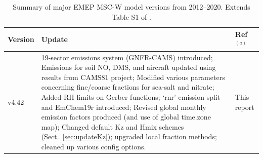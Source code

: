 \begin{table}
\begin{footnotesize}
\caption{Summary of major EMEP MSC-W model versions from 2012--2020.
Extends Table S1 of \citealt{Simpson:EMEP2012}.
}
\label{tab:Updates}
\centering
\begin{tabular}{lp{11cm}l}
\hline
Version & Update                                        & Ref$^{(a)}$   \\
\hline
v4.42  &  19-sector emissions system (GNFR-CAMS) introduced; %
Emissions for soil NO, DMS, and aircraft updated using results from
 CAMS81 project; %
 Modified various parameters concerning fine/coarse fractions for sea-salt and nitrate; Added RH limits on Gerber functions;
 `rnr' emission split and EmChem19r introduced;
           Revised global monthly emission factors produced (and use of global time.zone map);  %
           Changed default Kz  and Hmix schemes (Sect.~\ref{sec:updateKz}); 
         upgraded local fraction methods; cleaned up various config options. 
        & This report \\

\end{tabular}
\end{footnotesize}
\end{table}
